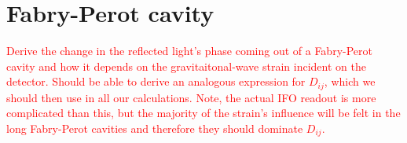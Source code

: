 \documentclass{article}
\begin{document}
\section*{Fabry-Perot cavity}

\textcolor{red}{
Derive the change in the reflected light's phase coming out of a Fabry-Perot cavity and how it depends on the gravitaitonal-wave strain incident on the detector.
Should be able to derive an analogous expression for $D_{ij}$, which we should then use in all our calculations.
Note, the actual IFO readout is more complicated than this, but the majority of the strain's influence will be felt in the long Fabry-Perot cavities and therefore they should dominate $D_{ij}$.
}


\end{document}
